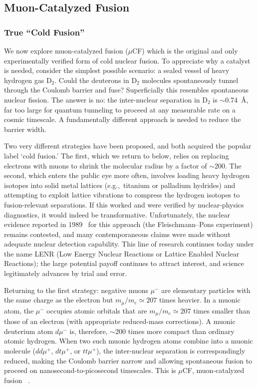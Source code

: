 \documentclass[particles,article,accept,pdftex,moreauthors]{Definitions/mdpi}
\begin{document}
\subsection{Muon-Catalyzed Fusion}\label{ssec:MuonCatalyzed}
\subsubsection{True ``Cold Fusion''}\label{sssec:CF}
We now explore muon-catalyzed fusion ($\mu$CF) which is the original and only experimentally verified form of cold nuclear fusion. To appreciate why a catalyst is needed, consider the simplest possible scenario: a sealed vessel of heavy hydrogen gas D$_2$. Could the deuterons in D$_2$ molecules spontaneously tunnel through the Coulomb barrier and fuse? Superficially this resembles spontaneous nuclear fission. The answer is no: the inter-nuclear separation in D$_2$ is $\sim$0.74~\AA, far too large for quantum tunneling to proceed at any measurable rate on a cosmic timescale. A fundamentally different approach is needed to reduce the barrier width.

Two very different strategies have been proposed, and both acquired the popular label `cold fusion.' The first, which we return to below, relies on replacing electrons with muons to shrink the molecular radius by a factor of $\sim$200. The second, which enters the public eye more often, involves loading heavy hydrogen isotopes into solid metal lattices (e.g.,\ titanium or palladium hydrides) and attempting to exploit lattice vibrations to compress the hydrogen isotopes to fusion-relevant separations. If this worked and were verified by nuclear-physics diagnostics, it would indeed be transformative. Unfortunately, the nuclear evidence reported in 1989~\cite{Jones:1989dv} for this approach (the Fleischmann--Pons experiment) remains contested, and many contemporaneous claims were made without adequate nuclear detection capability. This line of research continues today under the name LENR (Low Energy Nuclear Reactions or Lattice Enabled Nuclear Reactions); the large potential payoff continues to attract interest, and science legitimately advances by trial and error.

Returning to the first strategy: negative muons $\mu^-$ are elementary particles with the same charge as the electron but $m_\mu/m_e\simeq 207$ times heavier. In a muonic atom, the $\mu^-$ occupies atomic orbitals that are $m_\mu/m_e\simeq 207$ times smaller than those of an electron (with appropriate reduced-mass corrections). A muonic deuterium atom $d\mu^-$ is, therefore, $\sim$200 times more compact than ordinary atomic hydrogen. When two such muonic hydrogen atoms combine into a muonic molecule ($dd\mu^+$, $dt\mu^+$, or $tt\mu^+$), the inter-nuclear separation is correspondingly reduced, making the Coulomb barrier narrow and allowing spontaneous fusion to proceed on nanosecond-to-picosecond timescales. This is $\mu$CF, muon-catalyzed fusion ~\cite{Rafelski:1987Jones,Rafelski:1990gg,Rafelski:1990in}.
\end{document}
